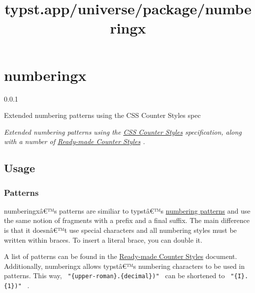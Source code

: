 \title{typst.app/universe/package/numberingx}

\label{banner}
\section{numberingx}\label{numberingx}

{ 0.0.1 }

Extended numbering patterns using the CSS Counter Styles spec

\label{readme}
\emph{Extended numbering patterns using the
\href{https://www.w3.org/TR/css-counter-styles-3/}{CSS Counter Styles}
specification, along with a number of
\href{https://www.w3.org/TR/predefined-counter-styles/}{Ready-made
Counter Styles} .}

\subsection{Usage}\label{usage}

\begin{Shaded}
\begin{Highlighting}[]
\NormalTok{\#} 

\OperatorTok{:}\NormalTok{(}
\NormalTok{))}
\end{Highlighting}
\end{Shaded}

\subsubsection{Patterns}\label{patterns}

numberingxâ€™s patterns are similiar to typstâ€™s
\href{https://typst.app/docs/reference/meta/numbering/}{numbering
patterns} and use the same notion of fragments with a prefix and a final
suffix. The main difference is that it doesnâ€™t use special characters
and all numbering styles must be written within braces. To insert a
literal brace, you can double it.

A list of patterns can be found in the
\href{https://www.w3.org/TR/predefined-counter-styles/}{Ready-made
Counter Styles} document. Additionally, numberingx allows typstâ€™s
numbering characters to be used in patterns. This way,
\texttt{\ "\{upper-roman\}.\{decimal\})"\ } can be shortened to
\texttt{\ "\{I\}.\{1\})"\ } .

